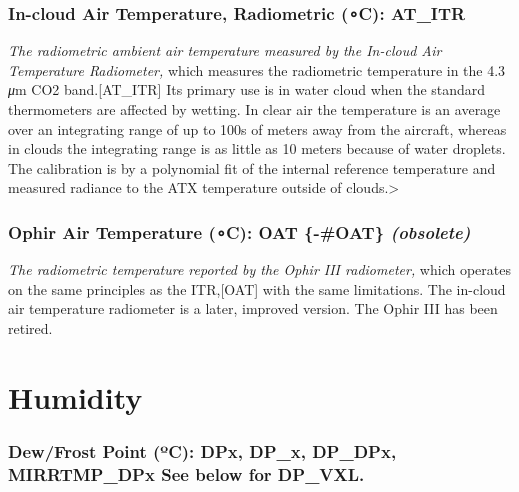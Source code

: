 \documentclass[
  english,
]{book}
\begin{document}
\hypertarget{AT-ITR}{%
\subsubsection*{\texorpdfstring{In-cloud Air Temperature, Radiometric
({∘}C):
AT\_ITR}{In-cloud Air Temperature, Radiometric (∘C): AT\_ITR}}\label{AT-ITR}}

\emph{The radiometric ambient air temperature measured by the In-cloud
Air Temperature Radiometer,} which measures the radiometric temperature
in the 4.3 {\emph{μ}}m CO{2}
band.\protect\hypertarget{AT_ITR}{}{{[}AT\_ITR{]}} Its primary use is in
water cloud when the standard thermometers are affected by wetting. In
clear air the temperature is an average over an integrating range of up
to 100s of meters away from the aircraft, whereas in clouds the
integrating range is as little as 10 meters because of water droplets.
The calibration is by a polynomial fit of the internal reference
temperature and measured radiance to the ATX temperature outside of
clouds.\textgreater{}

\hypertarget{ophir-air-temperature-c-oat--oat-obsolete}{%
\subsubsection{\texorpdfstring{Ophir Air Temperature ({∘}C): OAT
\{-\#OAT\}
\emph{(obsolete)}}{Ophir Air Temperature (∘C): OAT \{-\#OAT\} (obsolete)}}\label{ophir-air-temperature-c-oat--oat-obsolete}}

\emph{The radiometric temperature reported by the Ophir III radiometer,}
which operates on the same principles as the
ITR,\protect\hypertarget{OAT}{}{{[}OAT{]}} with the same limitations.
The in-cloud air temperature radiometer is a later, improved version.
The Ophir III has been retired.

\hypertarget{humidity}{%
\section{Humidity}\label{humidity}}

\hypertarget{dew-point}{%
\subsubsection*{\texorpdfstring{Dew/Frost Point ({º}C): DPx, DP\_x,
DP\_DPx, MIRRTMP\_DPx See below for
DP\_VXL.}{Dew/Frost Point (ºC): DPx, DP\_x, DP\_DPx, MIRRTMP\_DPx See below for DP\_VXL.}}\label{dew-point}}
\end{document}
